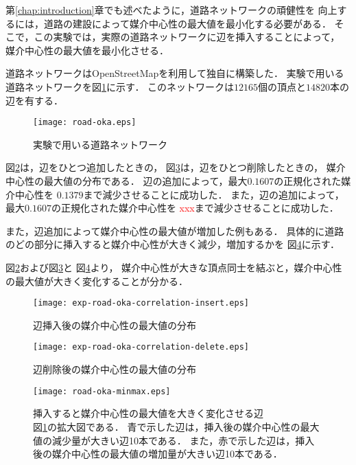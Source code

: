 第\ref{chap:introduction}章でも述べたように，道路ネットワークの頑健性を
向上するには，道路の建設によって媒介中心性の最大値を最小化する必要がある．
そこで，この実験では，実際の道路ネットワークに辺を挿入することによって，
媒介中心性の最大値を最小化させる．

道路ネットワークはOpenStreetMap\cite{OpenStreetMap}を利用して独自に構築した．
実験で用いる道路ネットワークを図\ref{fig:road-okayama}に示す．
このネットワークは$12165$個の頂点と$14820$本の辺を有する．

\begin{figure}[tb]
  \centering
  \texttt{[image: road-oka.eps]}
  \caption{実験で用いる道路ネットワーク}
  \label{fig:road-okayama}
\end{figure}

図\ref{fig:exp-road-oka-correlation-insert}は，辺をひとつ追加したときの，
図\ref{fig:exp-road-oka-correlation-delete}は，辺をひとつ削除したときの，
媒介中心性の最大値の分布である．
辺の追加によって，最大$0.1607$の正規化された媒介中心性を
$0.1379$まで減少させることに成功した．
また，辺の追加によって，最大$0.1607$の正規化された媒介中心性を
\textcolor{red}{xxx}まで減少させることに成功した．


また，辺追加によって媒介中心性の最大値が増加した例もある．
具体的に道路のどの部分に挿入すると媒介中心性が大きく減少，増加するかを
図\ref{fig:road-okayama-minmax}に示す．

図\ref{fig:exp-road-oka-correlation-insert}および図\ref{fig:exp-road-oka-correlation-delete}と
図\ref{fig:road-okayama-minmax}より，
媒介中心性が大きな頂点同士を結ぶと，媒介中心性の最大値が大きく変化することが分かる．

\begin{figure}[tb]
  \centering
  \texttt{[image: exp-road-oka-correlation-insert.eps]}
  \caption{辺挿入後の媒介中心性の最大値の分布}
  \label{fig:exp-road-oka-correlation-insert}
\end{figure}

\begin{figure}[tb]
  \centering
  \texttt{[image: exp-road-oka-correlation-delete.eps]}
  \caption{辺削除後の媒介中心性の最大値の分布}
  \label{fig:exp-road-oka-correlation-delete}
\end{figure}

\begin{figure}[tb]
  \centering
  \texttt{[image: road-oka-minmax.eps]}
  \caption{
    挿入すると媒介中心性の最大値を大きく変化させる辺 \\
    図\ref{fig:road-okayama}の拡大図である．
    青で示した辺は，挿入後の媒介中心性の最大値の減少量が大きい辺10本である．
    また，赤で示した辺は，挿入後の媒介中心性の最大値の増加量が大きい辺10本である．
  }
  \label{fig:road-okayama-minmax}
\end{figure}

